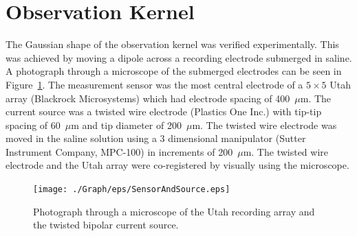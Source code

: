 \documentclass[]{article}
\begin{document}
\section*{Observation Kernel}
The Gaussian shape of the observation kernel was verified experimentally. This was achieved by moving a dipole across a recording electrode submerged in saline. A photograph through a microscope of the submerged electrodes can be seen in Figure~\ref{fig:SensorAndSource}. The measurement sensor was the most central electrode of a $5\times5$ Utah array (Blackrock Microsystems) which had electrode spacing of 400~$\mu$m. The current source was a twisted wire electrode (Plastics One Inc.) with tip-tip spacing of 60~$\mu$m and tip diameter of 200~$\mu$m. The twisted wire electrode was moved in the saline solution using a 3 dimensional manipulator (Sutter Instrument Company, MPC-100) in increments of 200~$\mu$m. The twisted wire electrode and the Utah array were co-registered by visually using the microscope. 
\begin{figure}[ht]		
	\begin{center}
	\texttt{[image: ./Graph/eps/SensorAndSource.eps]}
\end{center}
	\caption{Photograph through a microscope of the Utah recording array and the twisted bipolar current source.}
	\label{fig:SensorAndSource}
\end{figure}
\end{document}
